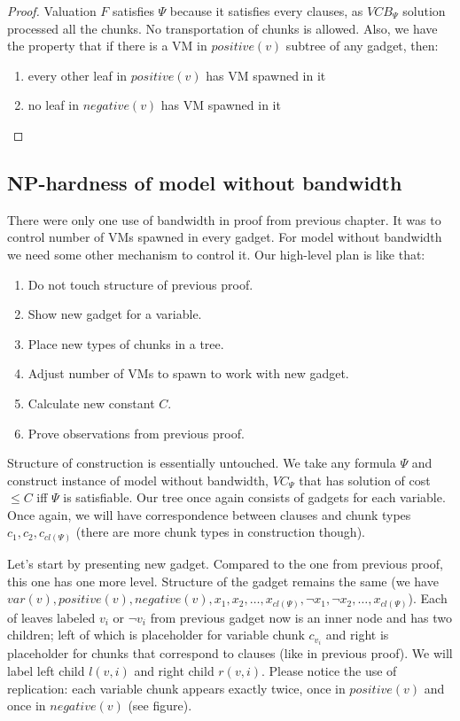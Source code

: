 \begin{proof}
Valuation $F$ satisfies $\Psi$ because it satisfies every clauses, as
$VCB_{\Psi}$ solution processed all the chunks. No transportation of
chunks is allowed. Also, we have the property that if there is a VM in
$positive(v)$ subtree of any gadget, then:

\begin{enumerate}
\item every other leaf in $positive(v)$ has VM spawned in it
\item no leaf in $negative(v)$ has VM spawned in it
\end{enumerate}

\end{proof}

\subsection{NP-hardness of model without bandwidth}

There were only one use of bandwidth in proof from previous
chapter. It was to control number of VMs spawned in every gadget. For
model without bandwidth we need some other mechanism to control
it. Our high-level plan is like that:
\begin{enumerate}
\item Do not touch structure of previous proof.
\item Show new gadget for a variable.
\item Place new types of chunks in a tree.
\item Adjust number of VMs to spawn to work with new gadget.
\item Calculate new constant $C$.
\item Prove observations from previous proof. 
\end{enumerate}

Structure of construction is essentially untouched. We take any
formula $\Psi$ and construct instance of model without bandwidth,
$VC_{\Psi}$ that has solution of cost $\leq C$ iff $\Psi$ is
satisfiable. Our tree once again consists of gadgets for each
variable. Once again, we will have correspondence between clauses and
chunk types $c_1, c_2, c_{cl(\Psi)}$ (there are more chunk types in
construction though).

Let's start by presenting new gadget. Compared to the one from
previous proof, this one has one more level. Structure of the gadget
remains the same (we have $var(v), positive(v), negative(v), x_1,
x_2, \ldots, x_{cl(\Psi)}, \neg x_1, \neg x_2, \ldots,
x_{cl(\Psi)}$). Each of leaves labeled $v_i$ or $\neg v_i$ from previous gadget now is an inner
node and has two children; left of which is placeholder for variable chunk $c_{v_i}$ and
right is placeholder for chunks that correspond to clauses (like in
previous proof). We will label left child $l(v, i)$ and right child
$r(v, i)$. Please notice the use of replication: each variable
chunk appears exactly twice, once in $positive(v)$ and once in
$negative(v)$ (see figure).

